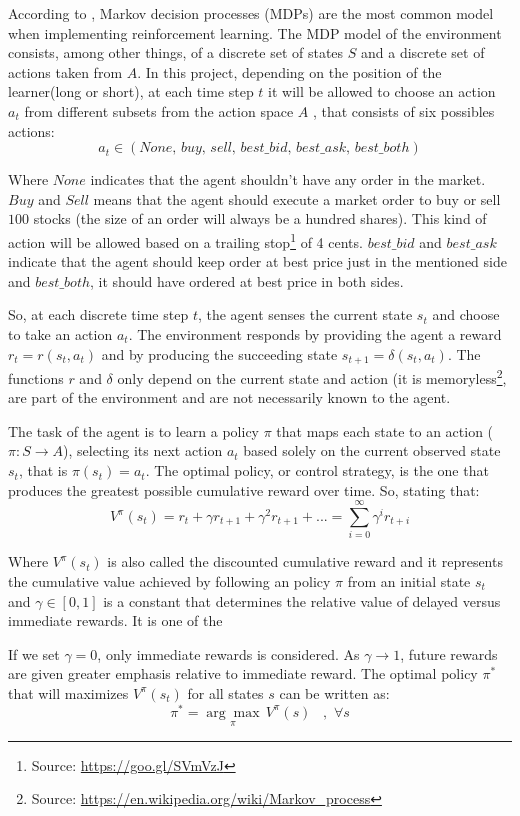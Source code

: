 \documentclass[a4paper]{article}
\begin{document}
According to \cite{chan2001electronic}, Markov decision processes (MDPs) are the most common model when implementing reinforcement learning.  The MDP model of the environment consists, among other things, of a discrete set of states $S$ and a discrete set of actions taken from $A$. In this project, depending on the position of the learner(long or short), at each time step $t$ it will be allowed to choose an action $a_t$ from different subsets from the action space $A$ , that consists of six possibles actions:
$$a_t \in \left (None,\, buy,\, sell,\, best\_bid,\, best\_ask,\, best\_both \right)$$

Where $None$ indicates that the agent shouldn't have any order in the market. $Buy$ and $Sell$ means that the agent should execute a market order to buy or sell $100$ stocks (the size of an order will always be a hundred shares). This kind of action will be allowed based on a trailing stop\footnote{Source: \url{https://goo.gl/SVmVzJ}} of 4 cents. $best\_bid$ and $best\_ask$ indicate that the agent should keep order at best price just in the mentioned side and $best\_both$, it should have ordered at best price in both sides.

So, at each discrete time step $t$, the agent senses the current state $s_t$ and choose to take an action $a_t$. The environment responds by providing the agent a reward $r_t=r(s_t, a_t)$ and by producing the succeeding state $s_{t+1}=\delta(s_t, a_t)$. The functions $r$ and $\delta$ only depend on the current state and action (it is memoryless\footnote{Source: \url{https://en.wikipedia.org/wiki/Markov_process}}, are part of the environment and are not necessarily known to the agent.

The task of the agent is to learn a policy $\pi$ that maps each state to an action ($\pi: S \rightarrow A$), selecting its next action $a_t$ based solely on the current observed state $s_t$, that is $\pi(s_t)=a_t$. The optimal policy, or control strategy, is the one that produces the greatest possible cumulative reward over time. So, stating that:
$$V^{\pi}(s_t)= r_t + \gamma r_{t+1} + \gamma^2 r_{t+1} + ... = \sum_{i=0}^{\infty} \gamma^{i} r_{t+i}$$

Where $V^{\pi}(s_t)$ is also called the discounted cumulative reward and it represents the cumulative value achieved by following an policy $\pi$ from an initial state $s_t$ and $\gamma \in [0, 1]$ is a constant that determines the relative value of delayed versus immediate rewards. It is one of the

If we set $\gamma=0$, only immediate rewards is considered. As $\gamma \rightarrow 1$, future rewards are given greater emphasis relative to immediate reward. The optimal policy $\pi^{*}$ that will maximizes $V^{\pi}(s_t)$ for all states $s$ can be written as:
$$\pi^{*} = \underset{\pi}{\arg \max} \, V^{\pi} (s)\,\,\,\,\,, \,\, \forall s$$
\end{document}

